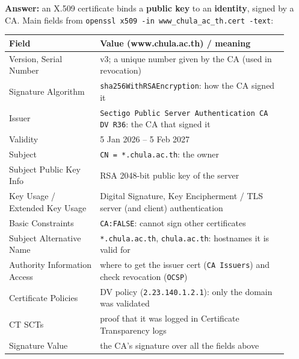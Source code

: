 \documentclass[a4paper, 10pt]{article}
\begin{document}
\begin{solution}
	\noindent \textbf{Answer:} an X.509 certificate binds a \textbf{public key} to an \textbf{identity}, signed by a CA.
	Main fields from \texttt{openssl x509 -in www\_chula\_ac\_th.cert -text}:
	\begin{center}
		\footnotesize
		\begin{tabular}{p{0.3\linewidth}p{0.62\linewidth}}
			\toprule
			Field & Value (www.chula.ac.th) / meaning \\
			\midrule
			Version, Serial Number & v3; a unique number given by the CA (used in revocation) \\
			Signature Algorithm & \texttt{sha256WithRSAEncryption}: how the CA signed it \\
			Issuer & \texttt{Sectigo Public Server Authentication CA DV R36}: the CA that signed it \\
			Validity & 5 Jan 2026 -- 5 Feb 2027 \\
			Subject & \texttt{CN = *.chula.ac.th}: the owner \\
			Subject Public Key Info & RSA 2048-bit public key of the server \\
			Key Usage / Extended Key Usage & Digital Signature, Key Encipherment / TLS server (and client) authentication \\
			Basic Constraints & \texttt{CA:FALSE}: cannot sign other certificates \\
			Subject Alternative Name & \texttt{*.chula.ac.th}, \texttt{chula.ac.th}: hostnames it is valid for \\
			Authority Information Access & where to get the issuer cert (\texttt{CA Issuers}) and check revocation (\texttt{OCSP}) \\
			Certificate Policies & DV policy (\texttt{2.23.140.1.2.1}): only the domain was validated \\
			CT SCTs & proof that it was logged in Certificate Transparency logs \\
			Signature Value & the CA's signature over all the fields above \\
			\bottomrule
		\end{tabular}
	\end{center}
\end{solution}
\end{document}
